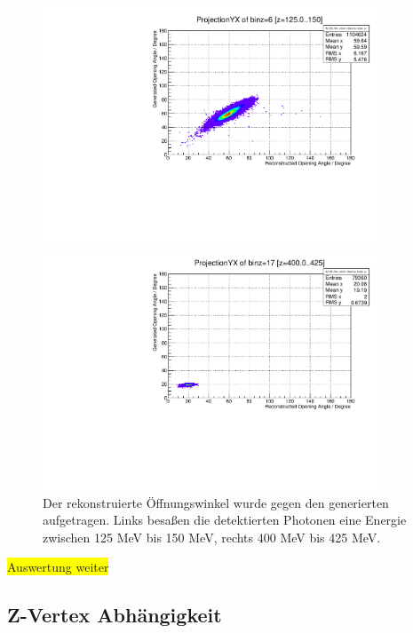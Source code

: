 \documentclass[a4paper,11pt,oneside,final,german,openbib,pdftex]{scrbook}
\begin{document}
{\begin{figure}[h!]
	\centering
	\begin{minipage}{0.45\textwidth}
		\centering
		\includegraphics[width=0.9\textwidth]{20171804RecGenOpeningAngle125MeV}
	\end{minipage}
\hfill
\begin{minipage}{0.45\textwidth}
	\centering
	\includegraphics[width=0.9\textwidth]{20171804RecGenOpeningAngle40MeV}
\end{minipage}
\caption{Der rekonstruierte \"Offnungswinkel wurde gegen den generierten aufgetragen. Links besa{\ss}en die detektierten Photonen eine Energie zwischen 125 MeV bis 150 MeV, rechts 400 MeV bis 425 MeV. }
\end{figure}


\colorbox{yellow}{Auswertung weiter}
\subsection{Z-Vertex Abh\"angigkeit}
\label{sec:Z-Vertex-Abhaengigkeit}

}
\end{document}
